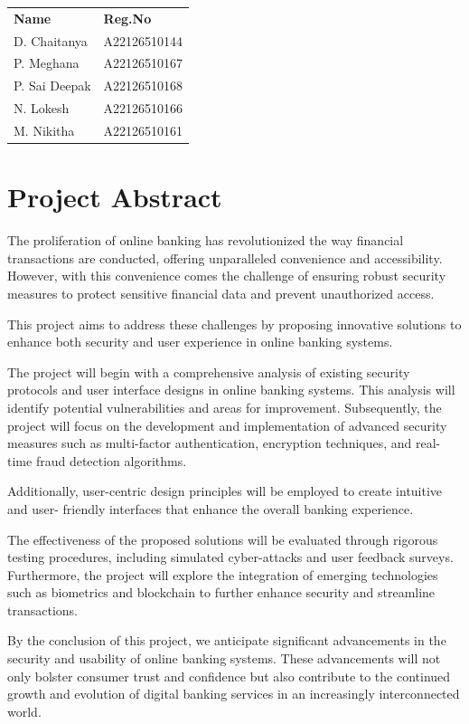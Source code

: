 \vspace{2cm}
\begin{tabular}{ll}
  \textbf{Name} & \textbf{Reg.No} \\
  D. Chaitanya & A22126510144 \\
  P. Meghana & A22126510167 \\
  P. Sai Deepak & A22126510168 \\
  N. Lokesh & A22126510166 \\
  M. Nikitha & A22126510161 \\
\end{tabular}
\newpage

\tableofcontents
\newpage

\chapter{Project Abstract}

The proliferation of online banking has revolutionized the way
financial transactions are
conducted, offering unparalleled convenience and accessibility.
However, with this
convenience comes the challenge of ensuring robust security measures
to protect sensitive
financial data and prevent unauthorized access.

This project aims to address these challenges by proposing innovative
solutions to enhance
both security and user experience in online banking systems.

The project will begin with a comprehensive analysis of existing
security protocols and user
interface designs in online banking systems. This analysis will
identify potential
vulnerabilities and areas for improvement. Subsequently, the project
will focus on the
development and implementation of advanced security measures such as
multi-factor
authentication, encryption techniques, and real-time fraud detection algorithms.

Additionally, user-centric design principles will be employed to
create intuitive and user-
friendly interfaces that enhance the overall banking experience.

The effectiveness of the proposed solutions will be evaluated through
rigorous testing
procedures, including simulated cyber-attacks and user feedback
surveys. Furthermore, the
project will explore the integration of emerging technologies such as
biometrics and
blockchain to further enhance security and streamline transactions.

By the conclusion of this project, we anticipate significant
advancements in the security and
usability of online banking systems. These advancements will not only
bolster consumer
trust and confidence but also contribute to the continued growth and
evolution of digital
banking services in an increasingly interconnected world.

